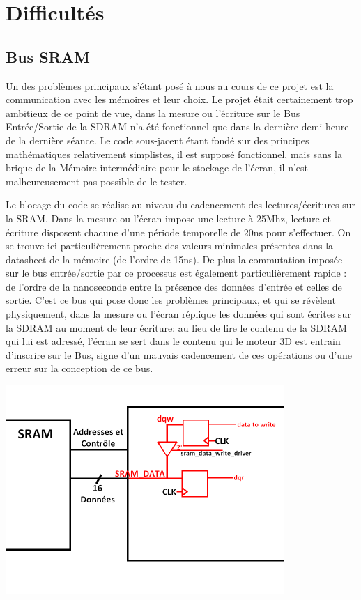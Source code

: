 \documentclass[10pt,a4paper]{report}
\begin{document}
\chapter{Difficultés}

\section{Bus SRAM}
Un des problèmes principaux s'étant posé à nous au cours de ce projet est la communication avec les mémoires et leur choix. Le projet était certainement trop ambitieux de ce point de vue, dans la mesure ou l'écriture sur le Bus Entrée/Sortie de la SDRAM n'a été fonctionnel que dans la dernière demi-heure de la dernière séance. Le code sous-jacent étant fondé sur des principes mathématiques relativement simplistes, il est supposé fonctionnel, mais sans la brique de la Mémoire intermédiaire pour le stockage de l'écran, il n'est malheureusement pas possible de le tester.

Le blocage du code se réalise au niveau du cadencement des lectures/écritures sur la SRAM. Dans la mesure ou l'écran impose une lecture à 25Mhz, lecture et écriture disposent chacune d'une période temporelle de 20ns pour s'effectuer. On se trouve ici particulièrement proche des valeurs minimales présentes dans la datasheet de la mémoire (de l'ordre de 15ns). De plus la commutation imposée sur le bus entrée/sortie par ce processus est également particulièrement rapide : de l'ordre de la nanoseconde entre la présence des données d'entrée et celles de sortie. C'est ce bus qui pose donc les problèmes principaux, et qui se révèlent physiquement, dans la mesure ou l'écran réplique les données qui sont écrites sur la SDRAM au moment de leur écriture: au lieu de lire le contenu de la SDRAM qui lui est adressé, l'écran se sert dans le contenu qui le moteur 3D est entrain d'inscrire sur le Bus, signe d'un mauvais cadencement de ces opérations ou d'une erreur sur la conception de ce bus.

\begin{center}
\includegraphics[width=300pt]{gfx/sram.png}
\end{center}
\end{document}
